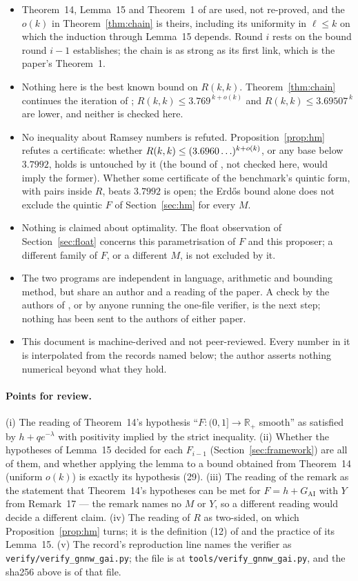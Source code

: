 \documentclass[11pt]{article}
\newcommand{\GAI}{G_{\mathrm{AI}}}
\begin{document}
\begin{itemize}
\item Theorem~14, Lemma~15 and Theorem~1 of \cite{GNNW} are used, not re-proved, and the $o(k)$ in Theorem~\ref{thm:chain} is theirs, including its uniformity in $\ell\le k$ on which the induction through Lemma~15 depends. Round $i$ rests on the bound round $i-1$ establishes; the chain is as strong as its first link, which is the paper's Theorem~1.
\item Nothing here is the best known bound on $R(k,k)$. Theorem~\ref{thm:chain} continues the iteration of \cite{GNNW}; $R(k,k)\le3.769^{\,k+o(k)}$ \cite{NSS26} and $R(k,k)\le3.69507^{\,k}$ \cite{LW26} are lower, and neither is checked here.
\item No inequality about Ramsey numbers is refuted. Proposition~\ref{prop:hm} refutes a certificate: whether $R(k,k)\le(3.6960\ldots)^{k+o(k)}$, or any base below $3.7992$, holds is untouched by it (the bound of \cite{LW26}, not checked here, would imply the former). Whether some certificate of the benchmark's quintic form, with pairs inside $R$, beats $3.7992$ is open; the Erd\H{o}s bound alone does not exclude the quintic $F$ of Section~\ref{sec:hm} for every $M$.
\item Nothing is claimed about optimality. The float observation of Section~\ref{sec:float} concerns this parametrisation of $F$ and this proposer; a different family of $F$, or a different $M$, is not excluded by it.
\item The two programs are independent in language, arithmetic and bounding method, but share an author and a reading of the paper. A check by the authors of \cite{GNNW}, or by anyone running the one-file verifier, is the next step; nothing has been sent to the authors of either paper.
\item This document is machine-derived and not peer-reviewed. Every number in it is interpolated from the records named below; the author asserts nothing numerical beyond what they hold.
\end{itemize}

\paragraph{Points for review.} (i) The reading of Theorem~14's hypothesis ``$F:(0,1]\to\mathbb R_+$ smooth'' as satisfied by $h+qe^{-\lambda}$ with positivity implied by the strict inequality. (ii) Whether the hypotheses of Lemma~15 decided for each $F_{i-1}$ (Section~\ref{sec:framework}) are all of them, and whether applying the lemma to a bound obtained from Theorem~14 (uniform $o(k)$) is exactly its hypothesis (29). (iii) The reading of the remark as the statement that Theorem~14's hypotheses can be met for $F=h+\GAI$ with $Y$ from Remark~17 --- the remark names no $M$ or $Y$, so a different reading would decide a different claim. (iv) The reading of $R$ as two-sided, on which Proposition~\ref{prop:hm} turns; it is the definition (12) of \cite{GNNW} and the practice of its Lemma~15. (v) The record's reproduction line names the verifier as \texttt{verify/verify\_gnnw\_gai.py}; the file is at \texttt{tools/verify\_gnnw\_gai.py}, and the sha256 above is of that file.
\end{document}
